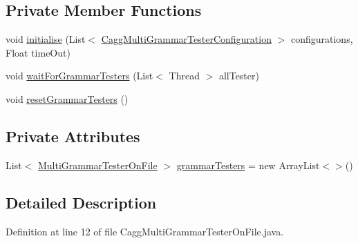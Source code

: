 \subsection*{Private Member Functions}
\begin{DoxyCompactItemize}
\item 
void \hyperlink{classit_1_1emarolab_1_1cagg_1_1interfaces_1_1CaggMultiGrammarTesterOnFile_ab9d5b9fe82bc5955b1d22196d0edf9aa}{initialise} (List$<$ \hyperlink{classit_1_1emarolab_1_1cagg_1_1interfaces_1_1CaggMultiGrammarTesterConfiguration}{Cagg\-Multi\-Grammar\-Tester\-Configuration} $>$ configurations, Float time\-Out)
\item 
void \hyperlink{classit_1_1emarolab_1_1cagg_1_1interfaces_1_1CaggMultiGrammarTesterOnFile_ad1bddb2b19319cbde11a858737bb3229}{wait\-For\-Grammar\-Testers} (List$<$ Thread $>$ all\-Tester)
\item 
void \hyperlink{classit_1_1emarolab_1_1cagg_1_1interfaces_1_1CaggMultiGrammarTesterOnFile_a796dc9a94b38f761b685bd39d378b7fe}{reset\-Grammar\-Testers} ()
\end{DoxyCompactItemize}
\subsection*{Private Attributes}
\begin{DoxyCompactItemize}
\item 
List$<$ \hyperlink{classit_1_1emarolab_1_1cagg_1_1interfaces_1_1CaggMultiGrammarTesterOnFile_1_1MultiGrammarTesterOnFile}{Multi\-Grammar\-Tester\-On\-File} $>$ \hyperlink{classit_1_1emarolab_1_1cagg_1_1interfaces_1_1CaggMultiGrammarTesterOnFile_a422be123c40e423312cc459ffdc0dd21}{grammar\-Testers} = new Array\-List$<$$>$()
\end{DoxyCompactItemize}


\subsection{Detailed Description}


Definition at line 12 of file Cagg\-Multi\-Grammar\-Tester\-On\-File.\-java.



